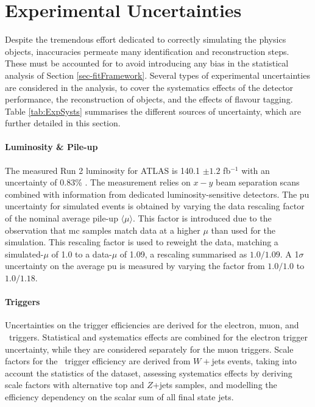 \section{Experimental Uncertainties}\label{sec-unc}
Despite the tremendous effort dedicated to correctly simulating the physics objects, inaccuracies permeate many identification and reconstruction steps. These must be accounted for to avoid introducing any bias in the statistical analysis of Section \ref{sec-fitFramework}. Several types of experimental uncertainties are considered in the analysis, to cover the systematics effects of the detector performance, the reconstruction of objects, and the effects of flavour tagging. Table \ref{tab:ExpSysts} summarises the different sources of uncertainty, which are further detailed in this section.

\paragraph{Luminosity \& Pile-up} The measured Run 2 luminosity for ATLAS is 140.1 $\pm 1.2$ fb$^{-1}$ with an uncertainty of 0.83\% \cite{ATLAS:2022hro}. The measurement relies on $x-y$ beam separation scans combined with information from dedicated luminosity-sensitive detectors. The \gls{pu} uncertainty for simulated events is obtained by varying the data rescaling factor of the nominal average pile-up $\langle \mu \rangle$. This factor is introduced due to the observation that \gls{mc} samples match data at a higher $\mu$ than used for the simulation. This rescaling factor is used to reweight the data, matching a simulated-$\mu$ of 1.0 to a data-$\mu$ of 1.09, a rescaling summarised as $1.0/1.09$. A 1$\sigma$ uncertainty on the average \gls{pu} is measured by varying the factor from $1.0/1.0$ to $1.0/1.18$. %

\paragraph{Triggers} Uncertainties on the trigger efficiencies are derived for the electron, muon, and \etm\ triggers. Statistical and systematics effects are combined for the electron trigger uncertainty, while they are considered separately for the muon triggers. Scale factors for the \etm\ trigger efficiency are derived from $W+$jets events, taking into account the statistics of the dataset, assessing systematics effects by deriving scale factors with alternative top and $Z$+jets samples, and modelling the efficiency dependency on the scalar sum of all final state jets.

